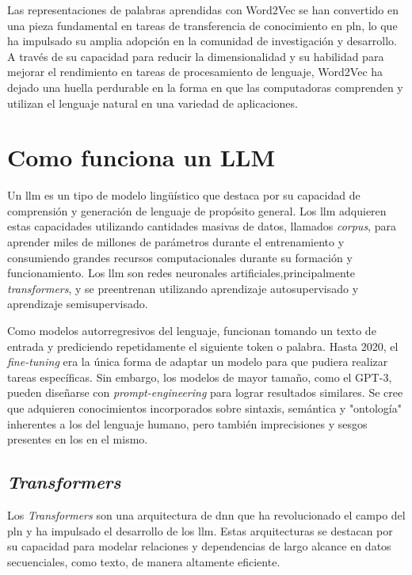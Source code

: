 Las representaciones de palabras aprendidas con Word2Vec se han convertido en una pieza fundamental en tareas de transferencia de conocimiento en \acrshort{pln}, lo que ha impulsado su amplia adopción en la comunidad de investigación y desarrollo. A través de su capacidad para reducir la dimensionalidad y su habilidad para mejorar el rendimiento en tareas de procesamiento de lenguaje, Word2Vec ha dejado una huella perdurable en la forma en que las computadoras comprenden y utilizan el lenguaje natural en una variedad de aplicaciones.

\section{Como funciona un LLM}

Un \acrfull{llm} es un tipo de modelo lingüístico que destaca por su capacidad de comprensión y generación de lenguaje de propósito general. Los \acrshort{llm} adquieren estas capacidades utilizando cantidades masivas de datos, llamados \textit{corpus}, para aprender miles de millones de parámetros durante el entrenamiento y consumiendo grandes recursos computacionales durante su formación y funcionamiento\cite{radford_language_2019}. Los \acrshort{llm} son redes neuronales artificiales,principalmente \textit{transformers}\cite{Nvidia_Transformers}, y se preentrenan utilizando aprendizaje autosupervisado y aprendizaje semisupervisado.

Como modelos autorregresivos del lenguaje, funcionan tomando un texto de entrada y prediciendo repetidamente el siguiente token o palabra\cite{bowman2023eight}. Hasta 2020, el \textit{fine-tuning} era la única forma de adaptar un modelo para que pudiera realizar tareas específicas. Sin embargo, los modelos de mayor tamaño, como el GPT-3, pueden diseñarse con \textit{prompt-engineering} para lograr resultados similares. Se cree que adquieren conocimientos incorporados sobre sintaxis, semántica y "ontología" inherentes a los del lenguaje humano, pero también imprecisiones y sesgos presentes en los en el mismo.

\subsection{\textit{Transformers}}

Los \textit{Transformers} son una arquitectura de \acrfull{dnn} que ha revolucionado el campo del \acrfull{pln} y ha impulsado el desarrollo de los \acrfull{llm}. Estas arquitecturas se destacan por su capacidad para modelar relaciones y dependencias de largo alcance en datos secuenciales, como texto, de manera altamente eficiente\cite{Nvidia_Transformers, turner2023introduction}.


